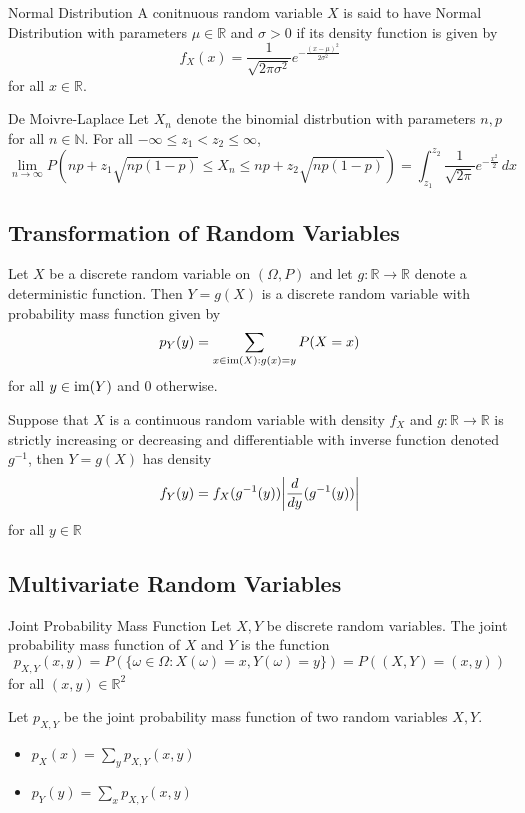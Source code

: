 \documentclass[a4paper]{article}
\begin{document}
\begin{defn}{Normal Distribution}{} A conitnuous random variable $X$ is said to have Normal Distribution with parameters $\mu\in\mathbb{R}$ and $\sigma>0$ if its density function is given by $$f_X(x)=\frac{1}{\sqrt{2\pi\sigma^2}}e^{-\frac{(x-\mu)^2}{2\sigma^2}}$$ for all $x\in\mathbb{R}$. 
\end{defn}

\begin{thm}{De Moivre-Laplace}{} Let $X_n$ denote the binomial distrbution with parameters $n,p$ for all $n\in\mathbb{N}$. For all $-\infty\leq z_1<z_2\leq \infty$, $$\lim_{n\to\infty}P\left(np+z_1\sqrt{np(1-p)}\leq X_n\leq np+z_2\sqrt{np(1-p)}\right)=\int_{z_1}^{z_2}\frac{1}{\sqrt{2\pi}}e^{-\frac{x^2}{2}}\, dx$$
\end{thm}

\subsection{Transformation of Random Variables}
\begin{thm}{}{} Let $X$ be a discrete random variable on $(\Omega,P)$ and let $g:\mathbb{R}\to\mathbb{R}$ denote a deterministic function. Then $Y=g(X)$ is a discrete random variable with probability mass function given by $$p_Y(y)=\sum_{x\in\operatorname{im}(X):g(x)=y}P(X=x)$$ for all $y\in\operatorname{im}(Y)$ and $0$ otherwise. 
\end{thm}

\begin{thm}{}{} Suppose that $X$ is a continuous random variable with density $f_X$ and $g:\mathbb{R}\to\mathbb{R}$ is strictly increasing or decreasing and differentiable with inverse function denoted $g^{-1}$, then $Y=g(X)$ has density $$f_Y(y)=f_X(g^{-1}(y))\abs{\frac{d}{dy}(g^{-1}(y))}$$ for all $y\in\mathbb{R}$
\end{thm}

\subsection{Multivariate Random Variables}
\begin{defn}{Joint Probability Mass Function}{} Let $X,Y$ be discrete random variables. The joint probability mass function of $X$ and $Y$ is the function $$p_{X,Y}(x,y)=P(\{\omega\in\Omega:X(\omega)=x,Y(\omega)=y\})=P((X,Y)=(x,y))$$ for all $(x,y)\in\mathbb{R}^2$
\end{defn}

\begin{thm}{}{} Let $p_{X,Y}$ be the joint probability mass function of two random variables $X,Y$. 
\begin{itemize}
\item $p_X(x)=\sum_{y}p_{X,Y}(x,y)$
\item $p_Y(y)=\sum_{x}p_{X,Y}(x,y)$
\end{itemize}
\end{thm}
\end{document}
